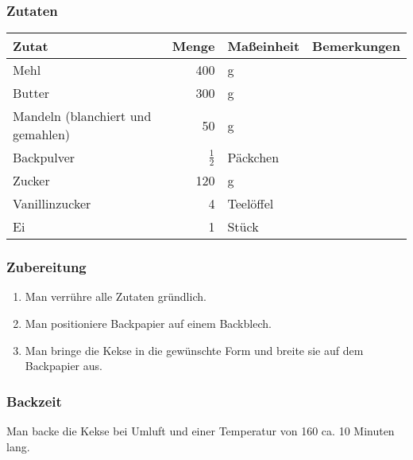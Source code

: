 \documentclass[a4paper]{book}
\begin{document}
\subsubsection{Zutaten}
\begin{center}
	\begin{tabular}{|l|rl|r|}
		\hline
		\textbf{Zutat} & \textbf{Menge} & \textbf{Maßeinheit} & \textbf{Bemerkungen}\\
		\hline
		Mehl & 400 & g & \\
		Butter & 300 & g & \\
		\hline
		Mandeln (blanchiert und gemahlen) & 50 & g & \\
		Backpulver & $\frac{1}{2}$ & Päckchen & \\
		\hline
		Zucker & 120 & g & \\
		Vanillinzucker & 4 & Teelöffel & \\
		\hline
		Ei & 1 &  Stück & \\
		\hline
	\end{tabular}
\end{center}

\subsubsection{Zubereitung}

\begin{enumerate}[(1)]
	\item Man verrühre alle Zutaten gründlich.
	\item Man positioniere Backpapier auf einem Backblech.
	\item Man bringe die Kekse in die gewünschte Form und breite sie auf dem Backpapier aus.
\end{enumerate}
\subsubsection{Backzeit}
	Man backe die Kekse bei Umluft und einer Temperatur von 160{\textcelsius} ca. 10 Minuten lang.
\end{document}
